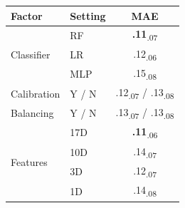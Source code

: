 \begin{tabular}{llc}
\toprule
\textbf{Factor} & \textbf{Setting} & \textbf{MAE} \\
\midrule
\multirow{3}{*}{Classifier} & RF & \textbf{.11}\textsubscript{.07} \\
& LR & .12\textsubscript{.06} \\
& MLP & .15\textsubscript{.08} \\
\midrule
Calibration & Y / N & .12\textsubscript{.07} / .13\textsubscript{.08} \\
Balancing & Y / N & .13\textsubscript{.07} / .13\textsubscript{.08} \\
\midrule
\multirow{4}{*}{Features} & 17D & \textbf{.11}\textsubscript{.06} \\
& 10D & .14\textsubscript{.07} \\
& 3D & .12\textsubscript{.07} \\
& 1D & .14\textsubscript{.08} \\
\bottomrule
\end{tabular}
